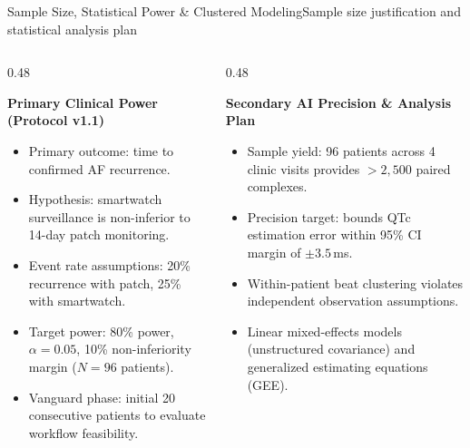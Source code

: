 \documentclass[aspectratio=169,10pt]{beamer}
\begin{document}
\begin{frame}{Sample Size, Statistical Power \& Clustered Modeling}{Sample size justification and statistical analysis plan}
\begin{columns}[T]
  \begin{column}{0.48\textwidth}
    \begin{block}{\textbf{Primary Clinical Power (Protocol v1.1)}}
      \scriptsize
      \begin{itemize}
        \setlength{\itemsep}{0.2em}
        \item Primary outcome: time to confirmed AF recurrence.
        \item Hypothesis: smartwatch surveillance is non-inferior to 14-day patch monitoring.
        \item Event rate assumptions: 20\% recurrence with patch, 25\% with smartwatch.
        \item Target power: 80\% power, $\alpha = 0.05$, 10\% non-inferiority margin ($N=96$ patients).
        \item Vanguard phase: initial 20 consecutive patients to evaluate workflow feasibility.
      \end{itemize}
    \end{block}
  \end{column}
  \begin{column}{0.48\textwidth}
    \begin{block}{\textbf{Secondary AI Precision \& Analysis Plan}}
      \scriptsize
      \begin{itemize}
        \setlength{\itemsep}{0.2em}
        \item Sample yield: 96 patients across 4 clinic visits provides $>2,500$ paired complexes.
        \item Precision target: bounds QTc estimation error within 95\% CI margin of $\pm 3.5$\,ms.
        \item Within-patient beat clustering violates independent observation assumptions.
        \item Linear mixed-effects models (unstructured covariance) and generalized estimating equations (GEE).
      \end{itemize}
    \end{block}
  \end{column}
\end{columns}

\end{frame}
\end{document}

